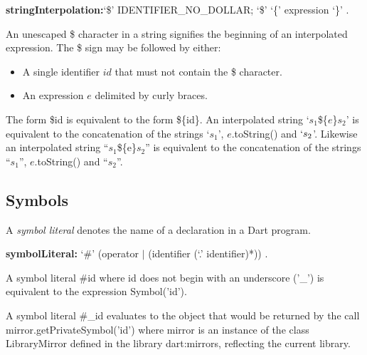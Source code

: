 \documentclass{article}
\newcommand{\code}[1]{{\sf #1}}
\begin{document}
 \begin{grammar}
{\bf stringInterpolation:}`\$' IDENTIFIER\_NO\_DOLLAR;
      `\$' `\{' expression `\}' %
    .
 \end{grammar}
 

\LMHash{}
An unescaped \$ character in a string signifies the beginning of an interpolated expression.  The \$ sign may be followed by either:
\begin{itemize}
\item A single identifier $id$ that must not contain the \$ character. 
\item An expression $e$ delimited by curly braces.
\end{itemize}

\LMHash{}
The form \code{\$id} is equivalent to the form \code{\$\{id\}}.  An interpolated string \code{`$s_1$\$\{$e$\}$s_2$'}  is equivalent to the concatenation of the  strings \code{`$s_1$'},  \code{$e$.toString()} and  \code{$`s_2$'}. Likewise an interpolated string \code{``$s_1$\$\{e\}$s_2$''} is equivalent to the concatenation of the strings \code{``$s_1$''}, \code{$e$.toString()} and  \code{``$s_2$''}.

\subsection{Symbols}

\LMHash{}
A {\em symbol literal} denotes the name of a declaration in a Dart program. 

\begin{grammar}
{\bf symbolLiteral:}
      `\#'  (operator $|$ (identifier (`{\escapegrammar .}' identifier)*))  .
\end{grammar}

\LMHash{}
A symbol literal \code{\#id} where \code{id} does not begin with an underscore ('\code{\_}')  is equivalent to the expression \code{\CONST{} Symbol('id')}.  

\LMHash{}
A symbol literal \code{\#\_id} evaluates to the object that would be returned by the call \code{mirror.getPrivateSymbol('id')} where mirror is an instance of the class \code{LibraryMirror} defined in the library \code{dart:mirrors}, reflecting the current library.
\end{document}
